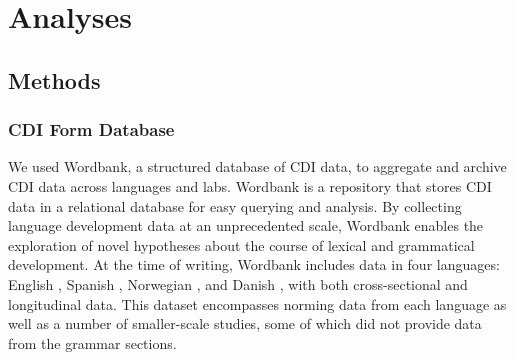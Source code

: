 \documentclass[10pt,letterpaper]{article}
\begin{document}
\section{Analyses}

\subsection{Methods}

\subsubsection{CDI Form Database}

We used Wordbank, a structured database of CDI data, to aggregate and archive CDI data across languages and labs. Wordbank is a repository that stores CDI data in a relational database for easy querying and analysis. By collecting language development data at an unprecedented scale, Wordbank enables the exploration of novel hypotheses about the course of lexical and grammatical development. At the time of writing, Wordbank includes data in four languages: English \cite{fenson2007}, Spanish \cite{jackson1993}, Norwegian \cite{simonsen2014}, and Danish \cite{bleses2008}, with both cross-sectional and longitudinal data. This dataset encompasses norming data from each language as well as a number of smaller-scale studies, some of which did not provide data from the grammar sections. %

\end{document}
